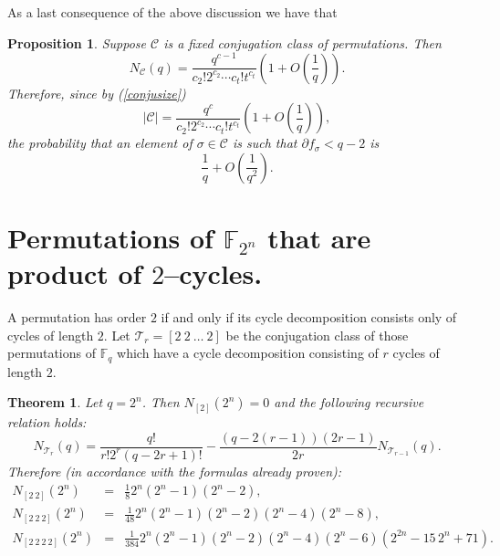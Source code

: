 \documentclass[10pt,a4paper,twoside]{article}
\def\Fq{{\mathbb{F}}_q}
\def\Cl{{\mathcal{C}}}
\def\Tl{{\mathcal{T}}}
\newtheorem{theorem}{Theorem}[section]
\newtheorem{Proposition}{Proposition}[section]
\begin{document}
\noindent As a last consequence of the above discussion we have that

\begin{Proposition} Suppose $\Cl$ is a fixed conjugation class
of permutations. Then
$$N_\Cl(q)=\frac{q^{c-1}}{c_2!2^{c_2}\cdots c_t!t^{c_t}}
\left(1+O\left(\frac{1}{q}\right)\right).$$
Therefore, since by (\ref{conjusize})
$$|\Cl|=\frac{q^{c}}{c_2!2^{c_2}\cdots
c_t!t^{c_t}}\left(1+O\left(\frac{1}{q}\right)\right),$$
the probability that an element of $\sigma\in\Cl$
is such that $\partial f_\sigma<q-2$ is
$$\frac{1}{q}+O\left(\frac{1}{q^2}\right).$$
\end{Proposition}

\section{Permutations of $\mathbb F_{2^n}$ that are product of $2$--cycles.}

A permutation has order $2$ if and only if its cycle decomposition
consists only of cycles
of length $2$. Let $\Tl_{r}=[2\ 2\ \ldots \ 2]$ be the
conjugation class of those permutations
of $\Fq$ which have a cycle decomposition consisting of
$r$ cycles of length $2$.

\begin{theorem} Let $q=2^n$.
Then $N_{[2]}(2^n)=0$ and the following recursive relation holds:
$$N_{\Tl_{r}}(q)=
\frac{q!}{r!2^r(q-2r+1)!}-\frac{(q-2(r-1))(2r-1)}{2r}N_{\Tl_{r-1}}(q).$$
Therefore (in accordance with the formulas already proven):
$$\begin{array}{rcl}
{N}_{[2\ 2]}(2^n)&=&\frac{1}{8}2^n(2^n-1)(2^n-2),\\
 {N}_{[2\ 2\ 2]}(2^n)&=&\frac{1}{48}2^n(2^n-1)(2^n-2)(2^n-4)(2^n-8),\\
{N}_{[2\ 2\ 2\ 2]}(2^n)&=&\frac{1}{384}{2}^{n}({2}^{n}-1)({2}^{n}-2)({2}^{n}-
4)({2}^{n}-6 )({2}^{2n}-15\,{2}^{n}+71).\end{array}$$
\end{theorem}
\end{document}
